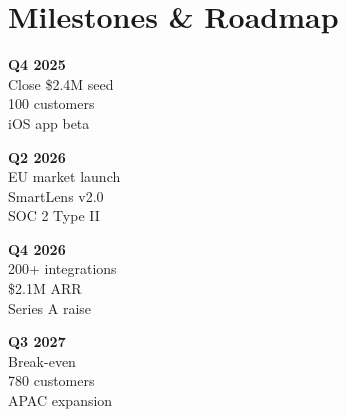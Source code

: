 \documentclass[11pt,a4paper]{article}
\newcommand{\sectionicon}[1]{\textcolor{NexaTeal}{#1}\hspace{4pt}}
\begin{document}
\section{\sectionicon{\faFlag}Milestones \& Roadmap}

\noindent
\begin{minipage}[t]{0.23\linewidth}
  \begin{tcolorbox}[milebox]
    \centering
    {\color{NexaGold}\bfseries Q4 2025}\\[3pt]
    {\small\color{TextBody}
      Close \$2.4M seed\\[2pt]
      100 customers\\[2pt]
      iOS app beta}
  \end{tcolorbox}
\end{minipage}\hspace{4pt}
\begin{minipage}[t]{0.23\linewidth}
  \begin{tcolorbox}[milebox]
    \centering
    {\color{NexaTeal}\bfseries Q2 2026}\\[3pt]
    {\small\color{TextBody}
      EU market launch\\[2pt]
      SmartLens v2.0\\[2pt]
      SOC 2 Type II}
  \end{tcolorbox}
\end{minipage}\hspace{4pt}
\begin{minipage}[t]{0.23\linewidth}
  \begin{tcolorbox}[milebox]
    \centering
    {\color{NexaNavy}\bfseries Q4 2026}\\[3pt]
    {\small\color{TextBody}
      200+ integrations\\[2pt]
      \$2.1M ARR\\[2pt]
      Series A raise}
  \end{tcolorbox}
\end{minipage}\hspace{4pt}
\begin{minipage}[t]{0.23\linewidth}
  \begin{tcolorbox}[milebox]
    \centering
    {\color{NexaNavy}\bfseries Q3 2027}\\[3pt]
    {\small\color{TextBody}
      Break-even\\[2pt]
      780 customers\\[2pt]
      APAC expansion}
  \end{tcolorbox}
\end{minipage}
\end{document}
